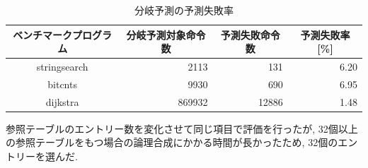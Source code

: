 \documentclass[../improvements.tex]{subflies}
\begin{document}
  \begin{table}[]
    \centering
    \begin{tabular}{|c|r|r|r|}
    \hline
    ベンチマークプログラム & \multicolumn{1}{c|}{分岐予測対象命令数} & \multicolumn{1}{c|}{予測失敗命令数} & \multicolumn{1}{c|}{予測失敗率 {[}\%{]}} \\ \hline
    stringsearch & 2113 & 131 & 6.20 \\
    bitcnts & 9930 & 690 & 6.95 \\
    dijkstra & 869932 & 12886 & 1.48 \\ \hline
    \end{tabular}
    \caption{分岐予測の予測失敗率}
    \label{table:miss-rate}
  \end{table}

  参照テーブルのエントリー数を変化させて同じ項目で評価を行ったが, 
  32個以上の参照テーブルをもつ場合の論理合成にかかる時間が長かったため, 
  32個のエントリーを選んだ.

\end{document}
